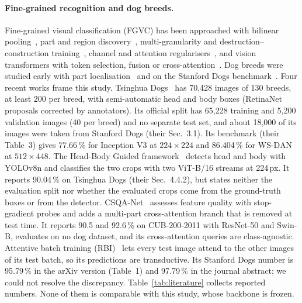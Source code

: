 \documentclass[11pt,a4paper]{article}
\theoremstyle{plain}
\begin{document}
\paragraph{Fine-grained recognition and dog breeds.}
Fine-grained visual classification (FGVC) has been approached with bilinear pooling~\citep{lin2015bilinear}, part
and region discovery~\citep{yang2018ntsnet,hu2019wsdan,vanderklis2023pdisconet}, multi-granularity and
destruction--construction training~\citep{du2020pmg,chen2019dcl}, channel and attention
regularisers~\citep{chang2020mcloss,luo2019crossx,sun2018mamc,rao2021cal}, and vision transformers with token
selection, fusion or cross-attention~\citep{he2022transfg,wang2021ffvt,hu2021ramstrans,sun2022simtrans,xu2023ielt,
zhu2022dcal,chou2023herbs,diao2022metaformer,jiang2024mpfgvc,zhang2025h3former,kim2022vitnet}. Dog breeds were
studied early with part localisation~\citep{liu2012dogparts} and on the Stanford Dogs
benchmark~\citep{khosla2011stanforddogs}. Four recent works frame this study.
Tsinghua Dogs~\citep{zou2020tsinghuadogs} has 70,428 images of 130 breeds, at least 200 per breed, with
semi-automatic head and body boxes (RetinaNet proposals corrected by annotators). Its official split has 65,228
training and 5,200 validation images (40 per breed) and no separate test set, and about 18,000 of its images were
taken from Stanford Dogs (their Sec.~3.1). Its benchmark (their Table~3) gives 77.66\,\% for Inception V3 at
$224\times224$ and 86.404\,\% for WS-DAN at $512\times448$.
The Head-Body Guided framework~\citep{khan2025headbody} detects head and body with YOLOv8n and classifies the two
crops with two ViT-B/16 streams at 224\,px. It reports 90.04\,\% on Tsinghua Dogs (their Sec.~4.4.2), but states
neither the evaluation split nor whether the evaluated crops come from the ground-truth boxes or from the detector.
CSQA-Net~\citep{xu2026csqanet} assesses feature quality with stop-gradient probes and adds a multi-part
cross-attention branch that is removed at test time. It reports 90.5 and 92.6\,\% on CUB-200-2011 with ResNet-50 and
Swin-B, evaluates on no dog dataset, and its cross-attention queries are class-agnostic.
Attentive batch training (RBI)~\citep{le2026rbi} lets every test image attend to the other images of its test batch,
so its predictions are transductive. Its Stanford Dogs number is 95.79\,\% in the arXiv version (Table~1) and
97.79\,\% in the journal abstract; we could not resolve the discrepancy.
Table~\ref{tab:literature} collects reported numbers. None of them is comparable with this study, whose backbone
is frozen.
\end{document}
